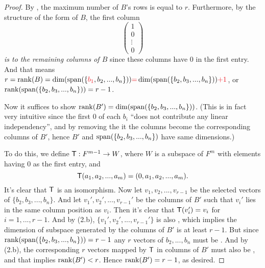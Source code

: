 \begin{proof}
By , the maximum number of \(B\)'s \LID{} rows is equal to \(r\).
Furthermore, by the structure of the form of \(B\), the first column
\[
    \begin{pmatrix} 1 \\ 0 \\ \vdots \\ 0 \end{pmatrix}
\]
\emph{is \LID{} to the remaining columns of \(B\)} since these columns have \(0\) in the first entry.
And that means \(r = \rank(B) = \dim(\spann(\{ \RED{b_1}, b_2, ..., b_n \})) \RED{=} \dim(\spann(\{ b_2, b_3, ..., b_n \})) \RED{+ 1}\), or \(\mathrm{rank}(\operatorname{span}(\{ b_2, b_3, ..., b_n \})) = r - 1\).

Now it suffices to show \(\mathrm{rank}(B') = \dim(\operatorname{span}(\{ b_2, b_3, ..., b_n \}))\).
(This is in fact very intuitive since the first \(0\) of each \(b_i\) ``does not contribute any linear independency'', and by removing the it the columns become the corresponding columns of \(B'\), hence \(B'\) and \(\operatorname{span}(\{ b_2, b_3, ..., b_n \})\) have same dimensions.)

To do this, we define \(\textsf{T} : F^{m - 1} \to W\), where \(W\) is a subspace of \(F^m\) with elements having \(0\) as the first entry,
and
\[
    \textsf{T}(a_1, a_2, ..., a_m) = (0, a_1, a_2, ..., a_m).
\]
It's clear that \(\textsf{T}\) is an isomorphism.
Now let \(v_1, v_2, ..., v_{r - 1}\) be the selected \LID{} vectors of \(\{ b_2, b_3, ..., b_n \}\).
And let \(v_1', v_2', ..., v_{r - 1}'\) be the columns of \(B'\) such that \(v_i'\) lies in the same column position as \(v_i\).
Then it's clear that \(\textsf{T}(v_i') = v_i\) for \(i = 1, ..., r - 1\).
And by (2.b), \(\{ v_1', v_2', ..., v_{r - 1}'\}\) is also \LID{}, which implies the dimension of subspace generated by the columns of \(B'\) is at least \(r - 1\).
But since \(\mathrm{rank}(\operatorname{span}(\{ b_2, b_3, ..., b_n \})) = r - 1\) any \(r\) vectors  of \(b_2, ..., b_n\) must be \LDP{}.
And by (2.b), the corresponding \(r\) vectors mapped by \(\textsf{T}\) in columns of \(B'\) must also be \LDP{}, and that implies \(\mathrm{rank}(B') < r\).
Hence \(\mathrm{rank}(B') = r - 1\), as desired.
\end{proof}

